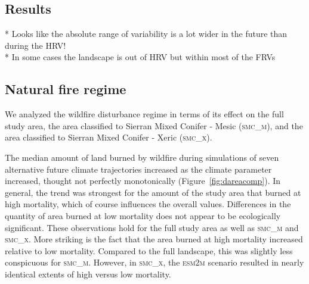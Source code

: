 \documentclass[12pt]{article}
\begin{document}
\begin{spacing}{1}
\section*{Results}
* Looks like the absolute range of variability is a lot wider in the future than during the HRV!  \\
* In some cases the landscape is out of HRV but within most of the FRVs

\subsection*{Natural fire regime}

We analyzed the wildfire disturbance regime in terms of its effect on the full study area, the area classified to Sierran Mixed Conifer - Mesic (\textsc{smc\_m}), and the area classified to Sierran Mixed Conifer - Xeric (\textsc{smc\_x}).

The median amount of land burned by wildfire during simulations of seven alternative future climate trajectories increased as the climate parameter increased, thought not perfectly monotonically (Figure~\ref{fig:dareacomp}). In general, the trend was strongest for the amount of the study area that burned at high mortality, which of course influences the overall values. Differences in the quantity of area burned at low mortality does not appear to be ecologically significant. These observations hold for the full study area as well as \textsc{smc\_m} and \textsc{smc\_x}. More striking is the fact that the area burned at high mortality increased relative to low mortality. Compared to the full landscape, this was slightly less conspicuous for \textsc{smc\_m}. However, in \textsc{smc\_x}, the \textsc{esm2m} scenario resulted in nearly identical extents of high versus low mortality. 




\end{spacing}
\end{document}
